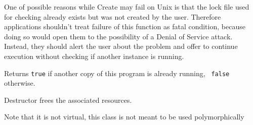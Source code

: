 One of possible reasons while Create may fail on Unix is that the lock file
used for checking already exists but was not created by the user.
Therefore applications shouldn't treat failure of this function as fatal
condition, because doing so would open them to the possibility of a Denial of
Service attack. Instead, they should alert the user about the problem and
offer to continue execution without checking if another instance is running.

\label{wxsingleinstancecheckerisanotherrunning}


Returns {\tt true} if another copy of this program is already running, {\tt
false} otherwise.

\label{wxsingleinstancecheckerdtor}


Destructor frees the associated resources.

Note that it is not virtual, this class is not meant to be used polymorphically

